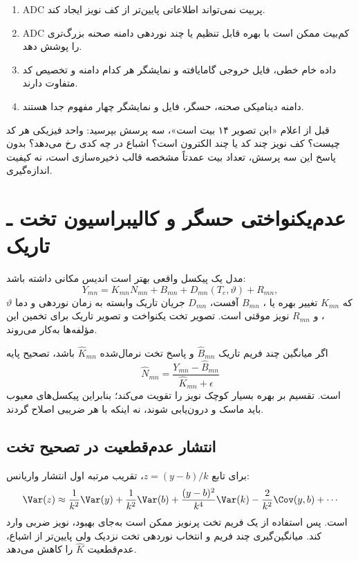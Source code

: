 \begin{enumerate}
\item ADC پر‌بیت نمی‌تواند اطلاعاتی پایین‌تر از کف نویز ایجاد کند.
\item ADC کم‌بیت ممکن است با بهره قابل تنظیم یا چند نوردهی دامنه صحنه بزرگ‌تری را پوشش دهد.
\item داده خام خطی، فایل خروجی گامایافته و نمایشگر هر کدام دامنه و تخصیص کد متفاوت دارند.
\item دامنه دینامیکی صحنه، حسگر، فایل و نمایشگر چهار مفهوم جدا هستند.
\end{enumerate}

\begin{keybox}
قبل از اعلام «این تصویر ۱۴ بیت است»، سه پرسش بپرسید: واحد فیزیکی هر کد چیست؟ کف نویز چند کد یا
چند الکترون است؟ اشباع در چه کدی رخ می‌دهد؟ بدون پاسخ این سه پرسش، تعداد بیت عمدتاً مشخصه قالب
ذخیره‌سازی است، نه کیفیت اندازه‌گیری.
\end{keybox}


\section{عدم‌یکنواختی حسگر و کالیبراسیون تخت ـ تاریک}

مدل یک پیکسل واقعی بهتر است اندیس مکانی داشته باشد:
\begin{equation}
Y_{mn}=K_{mn}N_{mn}+B_{mn}+D_{mn}(T_e,\vartheta)+R_{mn},
\label{eq:nonuniform-sensor}
\end{equation}
که \(K_{mn}\) تغییر بهره یا ، \(B_{mn}\) آفست، \(D_{mn}\) جریان تاریک وابسته به زمان
نوردهی و دما \(\vartheta\)، و \(R_{mn}\) نویز موقتی است. تصویر تخت یکنواخت و تصویر تاریک برای
تخمین این مؤلفه‌ها به‌کار می‌روند.

اگر میانگین چند فریم تاریک \(\widehat B_{mn}\) و پاسخ تخت نرمال‌شده \(\widehat K_{mn}\) باشد،
تصحیح پایه
\begin{equation}
\widehat N_{mn}=\frac{Y_{mn}-\widehat B_{mn}}
{\widehat K_{mn}+\epsilon}
\label{eq:flat-field-correction}
\end{equation}
است. تقسیم بر بهره بسیار کوچک نویز را تقویت می‌کند؛ بنابراین پیکسل‌های معیوب باید ماسک و
درون‌یابی شوند، نه اینکه با هر ضریبی اصلاح گردند.

\subsection{انتشار عدم‌قطعیت در تصحیح تخت}

برای تابع \(z=(y-b)/k\)، تقریب مرتبه اول انتشار واریانس:
\begin{equation}
\Var(z)\approx
\frac{1}{k^2}\Var(y)
+\frac{1}{k^2}\Var(b)
+\frac{(y-b)^2}{k^4}\Var(k)
-\frac{2}{k^2}\Cov(y,b)+\cdots
\label{eq:flat-uncertainty}
\end{equation}
است. پس استفاده از یک فریم تخت پرنویز ممکن است به‌جای بهبود، نویز ضربی وارد کند. میانگین‌گیری
چند فریم و انتخاب نوردهی تخت نزدیک ولی پایین‌تر از اشباع، عدم‌قطعیت \(\widehat K\) را کاهش می‌دهد.


